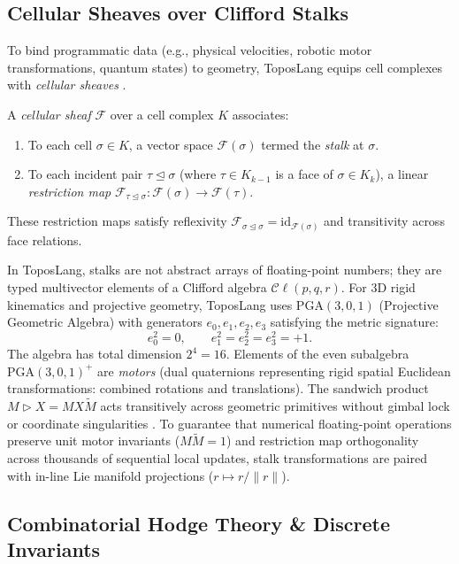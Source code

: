 \documentclass[acmsmall,screen,nonacm]{acmart}
\newcommand{\Cl}{\mathcal{C}\ell}
\newcommand{\PGA}{\mathrm{PGA}(3,0,1)}
\begin{document}
\subsection{Cellular Sheaves over Clifford Stalks}
\label{sec:cellular-sheaves}

To bind programmatic data (e.g., physical velocities, robotic motor transformations, quantum states) to geometry, ToposLang equips cell complexes with \emph{cellular sheaves} \cite{curry2014}.

\begin{definition}
A \emph{cellular sheaf} $\mathcal{F}$ over a cell complex $K$ associates:
\begin{enumerate}
    \item To each cell $\sigma \in K$, a vector space $\mathcal{F}(\sigma)$ termed the \emph{stalk} at $\sigma$.
    \item To each incident pair $\tau \trianglelefteq \sigma$ (where $\tau \in K_{k-1}$ is a face of $\sigma \in K_k$), a linear \emph{restriction map} $\mathcal{F}_{\tau \trianglelefteq \sigma} : \mathcal{F}(\sigma) \to \mathcal{F}(\tau)$.
\end{enumerate}
These restriction maps satisfy reflexivity $\mathcal{F}_{\sigma \trianglelefteq \sigma} = \mathrm{id}_{\mathcal{F}(\sigma)}$ and transitivity across face relations.
\end{definition}

In ToposLang, stalks are not abstract arrays of floating-point numbers; they are typed multivector elements of a Clifford algebra $\Cl(p,q,r)$. For 3D rigid kinematics and projective geometry, ToposLang uses $\PGA$ (Projective Geometric Algebra) with generators $e_0, e_1, e_2, e_3$ satisfying the metric signature:
\[
  e_0^2 = 0, \qquad e_1^2 = e_2^2 = e_3^2 = +1.
\]
The algebra has total dimension $2^4 = 16$. Elements of the even subalgebra $\PGA^+$ are \emph{motors} (dual quaternions representing rigid spatial Euclidean transformations: combined rotations and translations). The sandwich product $M \triangleright X = M X \widetilde{M}$ acts transitively across geometric primitives without gimbal lock or coordinate singularities \cite{dorst2020}. To guarantee that numerical floating-point operations preserve unit motor invariants ($M \widetilde{M} = 1$) and restriction map orthogonality across thousands of sequential local updates, stalk transformations are paired with in-line Lie manifold projections ($r \mapsto r / \|r\|$).

\subsection{Combinatorial Hodge Theory \& Discrete Invariants}
\label{sec:hodge-theory}
\end{document}

